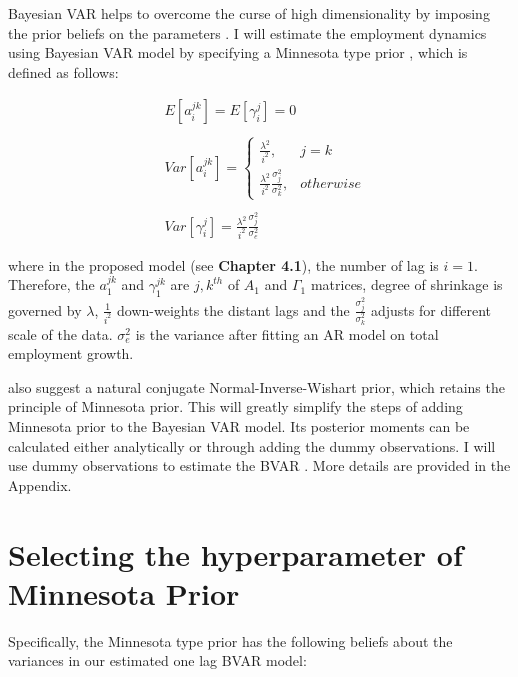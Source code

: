 \documentclass{monashthesis}
\begin{document}
Bayesian VAR helps to overcome the curse of high dimensionality by imposing the prior beliefs on the parameters \autocite{banbura2010large}. I will estimate the employment dynamics using Bayesian VAR model by specifying a Minnesota type prior \autocites[e.g.][]{anderson2020,litterman1986,robertson1999vector}, which is defined as follows:

\[
\begin{aligned}\label{eq:1}
&E[a_{i}^{jk}] = E[\gamma_{i}^j]=0\\
\\
&Var[a_i^{jk}]= 
\begin{cases}
\frac{\lambda^2}{i^2},&j=k\\
\frac{\lambda^2}{i^2}\frac{\sigma^2_{j}}{\sigma^2_k},& otherwise
\end{cases}\\
\\
&Var[\gamma_i^{j}]=\frac{\lambda^2}{i^2}\frac{\sigma^2_{j}}{\sigma^2_e}
\end{aligned}
\]

where in the proposed model (see \textbf{Chapter 4.1}), the number of lag is \(i=1\). Therefore, the \(a_{1}^{jk}\) and \(\gamma_{1}^{jk}\) are \({j,k}^{th}\) of \(A_1\) and \(\Gamma_1\) matrices, degree of shrinkage is governed by \(\lambda\), \(\frac{1}{i^2}\) down-weights the distant lags and the \(\frac{\sigma_j^2}{\sigma_k^2}\) adjusts for different scale of the data. \(\sigma^2_e\) is the variance after fitting an AR model on total employment growth.

\textcite{banbura2010large} also suggest a natural conjugate Normal-Inverse-Wishart prior, which retains the principle of Minnesota prior. This will greatly simplify the steps of adding Minnesota prior to the Bayesian VAR model. Its posterior moments can be calculated either analytically or through adding the dummy observations. I will use dummy observations to estimate the BVAR \autocite{banbura2010large}. More details are provided in the Appendix.

\newpage

\hypertarget{selecting-the-hyperparameter-of-minnesota-prior}{%
\section{Selecting the hyperparameter of Minnesota Prior}\label{selecting-the-hyperparameter-of-minnesota-prior}}

Specifically, the Minnesota type prior has the following beliefs about the variances in our estimated one lag BVAR model:
\end{document}
